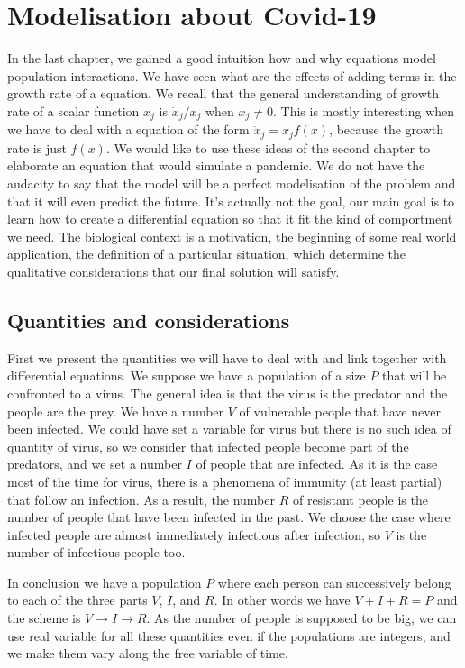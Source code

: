 \chapter{Modelisation about Covid-19}
In the last chapter, we gained a good intuition how and why \LV equations model population interactions. We have seen what are the effects of adding terms in the growth rate of a equation. We recall that the general understanding of growth rate of a scalar function $x_j$ is $\dot{x}_j/x_j$ when $x_j\neq0$. This is mostly interesting when we have to deal with a equation of the form $\dot{x}_j=x_jf(x)$, because the growth rate is just $f(x)$. We would like to use these ideas of the second chapter to elaborate an equation that would simulate a pandemic. We do not have the audacity to say that the model will be a perfect modelisation of the problem and that it will even predict the future. It's actually not the goal, our main goal is to learn how to create a differential equation so that it fit the kind of comportment we need. The biological context is a motivation, the beginning of some real world application, the definition of a particular situation, which determine the qualitative considerations that our final solution will satisfy.
\section{Quantities and considerations}
First we present the quantities we will have to deal with and link together with differential equations. We suppose we have a population of a size $P$ that will be confronted to a virus. The general idea is that the virus is the predator and the people are the prey. We have a number $V$ of vulnerable people that have never been infected. We could have set a variable for virus but there is no such idea of quantity of virus, so we consider that infected people become part of the predators, and we set a number $I$ of people that are infected. As it is the case most of the time for virus, there is a phenomena of immunity (at least partial) that follow an infection. As a result, the number $R$ of resistant people is the number of people that have been infected in the past. We choose the case where infected people are almost immediately infectious after infection, so $V$ is the number of infectious people too.

In conclusion we have a population $P$ where each person can successively belong to each of the three parts $V$, $I$, and $R$. In other words we have $V+I+R=P$ and the scheme is $V\to I\to R$.
As the number of people is supposed to be big, we can use real variable for all these quantities even if the populations are integers, and we make them vary along the free variable of time.


